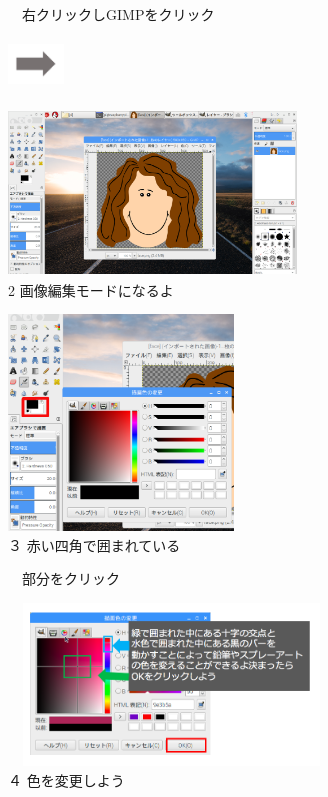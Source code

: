 \documentclass[a4paper,12pt]{jarticle}
\begin{document}
\begin{figure}[ht]
\begin{minipage}{\textwidth}
\begin{minipage}{5.852cm}
　右クリックしGIMPをクリック
\end{minipage}
\includegraphics[width=1.489cm,height=1.365cm]{textbook-img128.png}
\begin{minipage}{7.975cm}
\includegraphics[width=7.65cm,height=4.426cm]{textbook-img125.png}\\
2 画像編集モードになるよ
\end{minipage}


\end{minipage}
\bigskip




\begin{minipage}{\textwidth}
\begin{minipage}{5.984cm}
\includegraphics[width=5.971cm,height=5.738cm]{textbook-img129.png}\\
３ 赤い四角で囲まれている

　部分をクリック


\bigskip
\end{minipage}
\hfill
\begin{minipage}{8.984cm}
\includegraphics[width=8.654cm,height=4.325cm]{textbook-img126.png}\\
４ 色を変更しよう


\end{minipage}
\end{minipage}
\end{figure}
\end{document}
